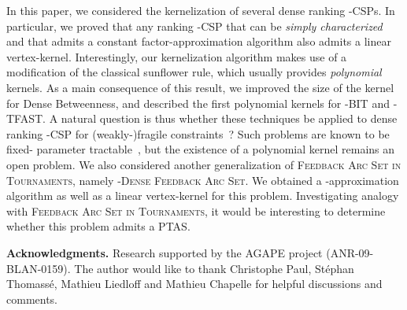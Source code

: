 \documentclass[11pt]{article}
\newcommand{\BIT}{{\sc Dense Betweenness}}
\newcommand{\FAST}{\textsc{Feedback Arc Set in Tournaments}}
\newcommand{\FASHT}{\textsc{-Dense Feedback Arc Set}}
\begin{document}
In this paper, we considered the kernelization of several dense ranking -CSPs. 
In particular, we proved that any ranking -CSP that can be \emph{simply characterized} and that 
admits a constant factor-approximation algorithm also admits a linear vertex-kernel. Interestingly, our kernelization algorithm makes use of a modification of the classical 
sunflower rule, which usually provides \emph{polynomial} kernels.  
As a main consequence of this result, we improved the size of the kernel for \BIT{}, and described the first polynomial kernels for {\sc -BIT} and {\sc -TFAST}. 
A natural question is thus whether these techniques be applied 
to dense ranking -CSP for (weakly-)fragile constraints~\cite{KS11}? Such problems are known to be fixed-
parameter tractable~\cite{KS10}, but the existence of a polynomial kernel remains an 
open problem. We also considered another generalization of \FAST{}, namely \FASHT{}. We obtained a -approximation algorithm as well as a linear vertex-kernel for this problem. Investigating analogy with \FAST{}, it would be interesting to determine whether this problem admits a PTAS. \\

{\small

\noindent \textbf{Acknowledgments.} Research supported by the AGAPE project  (ANR-09-BLAN-0159). The author would like to thank Christophe Paul, St\'ephan Thomass\'e,  Mathieu Liedloff and Mathieu Chapelle for helpful discussions and comments. 



}
\end{document}
